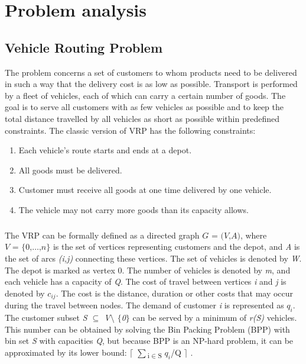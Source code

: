 \documentclass[a4paper,twoside,12pt]{book}
\begin{document}
\chapter{Problem analysis}

\section{Vehicle Routing Problem}
The problem concerns a set of customers to whom products need to be delivered in such a way that the delivery cost is as low as possible. Transport is performed by a fleet of vehicles, each of which can carry a certain number of goods. The goal is to serve all customers with as few vehicles as possible and to keep the total distance travelled by all vehicles as short as possible within predefined constraints. The classic version of VRP has the following constraints: 
\begin{enumerate}
	\item Each vehicle's route starts and ends at a depot.
	\item All goods must be delivered.
	\item Customer must receive all goods at one time delivered by one vehicle.
	\item The vehicle may not carry more goods than its capacity allows.	
\end{enumerate}
\paragraph{}
The VRP can be formally defined as a directed graph $\textit{G = (V,A)}$, where $\textit{V = $\lbrace$0,\ldots,n$\rbrace$}$ is the set of vertices representing customers and the depot, and \textit{A} is the set of arcs \textit{(i,j)} connecting these vertices. The set of vehicles is denoted by \textit{W}. The depot is marked as vertex 0. The number of vehicles is denoted by \textit{m}, and each vehicle has a capacity of \textit{Q}. The cost of travel between vertices \textit{i} and \textit{j} is denoted by \textit{$c_{ij}$}. The cost is the distance, duration or other costs that may occur during the travel between nodes. The demand of customer \textit{i} is represented as \textit{$q_{i}$}.
The customer subset \textit{S $\subseteq$ V$\setminus$ $\lbrace$0$\rbrace$} can be served by a minimum of \textit{r(S)} vehicles. This number can be obtained by solving the Bin Packing Problem (BPP) with bin set \textit{S} with capacities \textit{Q}, but because BPP is an NP-hard problem, it can be approximated by its lower bound: $\lceil$ $\sum$\textsubscript{i$\in$S} $q_{i}$/Q $\rceil$ \cite{bib:article:CordeauVehicleRouting}.
\end{document}
